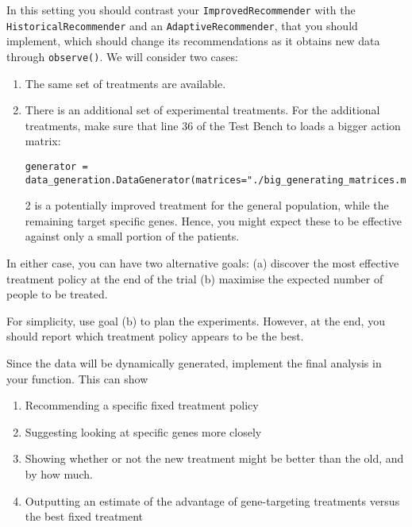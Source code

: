 \begin{exercise}
  In this setting you should contrast your \texttt{ImprovedRecommender} with the \texttt{HistoricalRecommender} and an \texttt{AdaptiveRecommender}, that you should implement, which should change its recommendations as it obtains new data through \verb!observe()!. We will consider two cases:
  \begin{enumerate}
  \item The same set of treatments are available.
  \item There is an additional set of experimental treatments.  
    For the additional treatments, make sure that line 36 of the Test Bench to loads a bigger action matrix:
\begin{verbatim}
generator = data_generation.DataGenerator(matrices="./big_generating_matrices.mat")
\end{verbatim}
    2 is a potentially improved treatment for the general population,
    while the remaining target specific genes.  Hence, you might
    expect these to be effective against only a small portion of the
    patients.
  \end{enumerate}
  In either case, you can have two alternative goals: (a) discover the most effective treatment policy at the end of the trial (b) maximise the expected number of people to be treated.

  For simplicity, use goal (b) to plan the experiments. However, at the end, you should report which treatment policy appears to be the best.

  Since the data will be dynamically generated, implement the final analysis in your function. This can show
  \begin{enumerate}
  \item  Recommending a specific fixed treatment policy
  \item Suggesting looking at specific genes more closely
  \item Showing whether or not the new treatment might be better than the old, and by how much.
  \item  Outputting an estimate of the advantage of gene-targeting treatments versus the best fixed treatment
  \end{enumerate}
\end{exercise}






